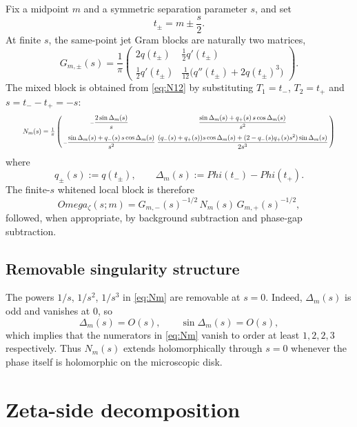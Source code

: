 \documentclass[11pt,a4paper]{amsart}
\def\Omega{Omega}%
\def\Phi{Phi}%
\theoremstyle{plain}
\theoremstyle{definition}
\newcommand{\Ph}{\Phi}
\begin{document}
Fix a midpoint $m$ and a symmetric separation parameter $s$, and set
\begin{equation}\label{eq:t-pm}
t_\pm = m\pm \frac{s}{2}.
\end{equation}
At finite $s$, the same-point jet Gram blocks are naturally two matrices,
\begin{equation}\label{eq:Gpm}
G_{m,\pm}(s)=\frac1\pi
\begin{pmatrix}
2q(t_\pm) & \frac12 q'(t_\pm)\\[1ex]
\frac12 q'(t_\pm) & \frac1{12}\bigl(q''(t_\pm)+2q(t_\pm)^3\bigr)
\end{pmatrix}.
\end{equation}
The mixed block is obtained from \eqref{eq:N12} by substituting $T_1=t_-$, $T_2=t_+$ and $s=t_--t_+=-s$:
\begin{equation}\label{eq:Nm}
\resizebox{.94\linewidth}{!}{$
N_m(s)=\frac1\pi
\left(\begin{smallmatrix}
-\dfrac{2\sin \Delta_m(s)}{s}
&
\dfrac{\sin \Delta_m(s)+q_+(s)\,s\cos \Delta_m(s)}{s^2}
\\[1.5ex]
-\dfrac{\sin \Delta_m(s)+q_-(s)\,s\cos \Delta_m(s)}{s^2}
&
\dfrac{(q_-(s)+q_+(s))s\cos \Delta_m(s)+(2-q_-(s)q_+(s)s^2)\sin \Delta_m(s)}{2s^3}
\end{smallmatrix}\right)
$}
\end{equation}
where
\[
q_\pm(s):=q(t_\pm),
\qquad
\Delta_m(s):=\Ph(t_-)-\Ph(t_+).
\]
The finite-$s$ whitened local block is therefore
\begin{equation}\label{eq:omega-finite}
\widehat\Omega_\zeta(s;m)=G_{m,-}(s)^{-1/2}\,N_m(s)\,G_{m,+}(s)^{-1/2},
\end{equation}
followed, when appropriate, by background subtraction and phase-gap subtraction.

\subsection{Removable singularity structure}

The powers $1/s$, $1/s^2$, $1/s^3$ in \eqref{eq:Nm} are removable at $s=0$. Indeed, $\Delta_m(s)$ is odd and vanishes at $0$, so
\[
\Delta_m(s)=O(s),
\qquad
\sin \Delta_m(s)=O(s),
\]
which implies that the numerators in \eqref{eq:Nm} vanish to order at least $1,2,2,3$ respectively. Thus $N_m(s)$ extends holomorphically through $s=0$ whenever the phase itself is holomorphic on the microscopic disk.

\section{Zeta-side decomposition}
\end{document}
